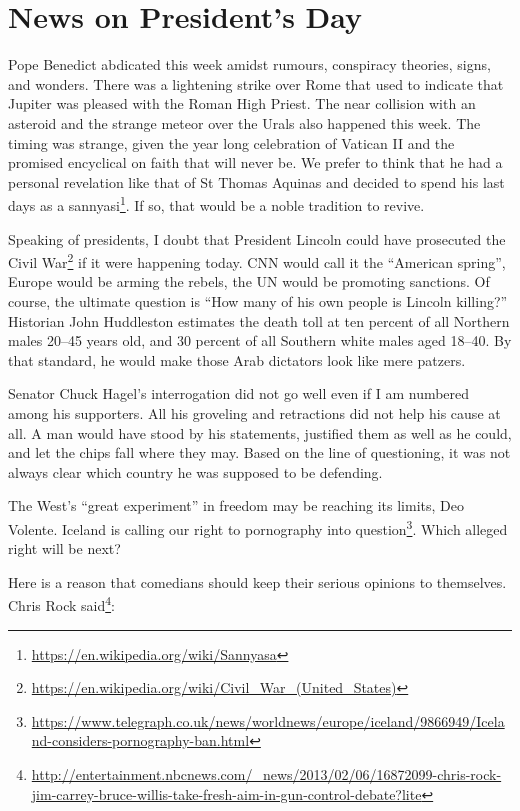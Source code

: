 \section{News on President’s Day}

Pope Benedict abdicated this week amidst rumours, conspiracy theories, signs, and wonders. There was a lightening strike over Rome that used to indicate that Jupiter was pleased with the Roman High Priest. The near collision with an asteroid and the strange meteor over the Urals also happened this week. The timing was strange, given the year long celebration of Vatican II and the promised encyclical on faith that will never be. We prefer to think that he had a personal revelation like that of St Thomas Aquinas and decided to spend his last days as a sannyasi\footnote{\url{https://en.wikipedia.org/wiki/Sannyasa}}. If so, that would be a noble tradition to revive.

Speaking of presidents, I doubt that President Lincoln could have prosecuted the Civil War\footnote{\url{https://en.wikipedia.org/wiki/Civil\_War\_(United\_States)}} if it were happening today. CNN would call it the ``American spring'', Europe would be arming the rebels, the UN would be promoting sanctions. Of course, the ultimate question is ``How many of his own people is Lincoln killing?'' Historian John Huddleston estimates the death toll at ten percent of all Northern males 20--45 years old, and 30 percent of all Southern white males aged 18--40. By that standard, he would make those Arab dictators look like mere patzers.

Senator Chuck Hagel's interrogation did not go well even if I am numbered among his supporters. All his groveling and retractions did not help his cause at all. A man would have stood by his statements, justified them as well as he could, and let the chips fall where they may. Based on the line of questioning, it was not always clear which country he was supposed to be defending.

The West's ``great experiment'' in freedom may be reaching its limits, Deo Volente. Iceland is calling our right to pornography into question\footnote{\url{https://www.telegraph.co.uk/news/worldnews/europe/iceland/9866949/Iceland-considers-pornography-ban.html}}. Which alleged right will be next?

Here is a reason that comedians should keep their serious opinions to themselves. Chris Rock said\footnote{\url{http://entertainment.nbcnews.com/\_news/2013/02/06/16872099-chris-rock-jim-carrey-bruce-willis-take-fresh-aim-in-gun-control-debate?lite}}:

